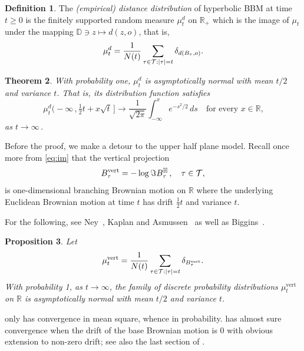 \documentclass[12pt]{amsart}
\newcommand\BB{\textit{\textbf{B}}}
\newcommand\DD{\mathbb D}
\newcommand\HH{\mathbb H}
\newcommand\nn{N}
\newcommand\R{\mathbb R}
\newcommand\ro{d}
\newcommand\T{\mathcal T}
\newtheorem{theorem}{Theorem}%
\numberwithin{theorem}{section}
\newtheorem{pro}[theorem]{Proposition}%
\theoremstyle{definition}
\newtheorem{dfn}[theorem]{Definition}%
\begin{document}
\begin{dfn}\label{def:distdist}
 The \emph{(empirical) distance distribution} of hyperbolic BBM at time $t\ge 0$ is
the finitely supported random measure $\mu_t^{\ro}$ on $\R_+$ which is the image of 
$\mu_t$ under the mapping $\DD \ni z \mapsto \ro(z,o)$, that is,
$$
\mu_t^{\ro} = \frac{1}{\nn(t)}\sum_{\tau \in \T: |\tau| = t} \delta_{\ro(\BB_{\tau},o)}.
$$
\end{dfn}

\begin{theorem}\label{thm:normal}
With probability one, $\mu_t^{\ro}$ is asymptotically normal with  mean
$t/2$ and variance $t$. That is, its distribution function satisfies 
$$
\mu_t^{\ro}\bigl(-\infty\,,\tfrac12 t + x \sqrt{t}\,\bigr] 
\to \frac{1}{\sqrt{2\pi}} \int_{-\infty}^x  e^{-s^2/2}\, ds  \quad \text{for every $x \in \R$,}
$$
as $t \to \infty\,$. 
\end{theorem}

Before the proof, we make a detour to the upper half plane model. Recall once more 
from \eqref{eq:im} that the vertical projection  
$$
\BB_{\tau}^{\text{vert}} = -\log \Im \BB_{\tau}^{\HH}\,, \quad \tau \in \T, 
$$
is one-dimensional branching Brownian motion on $\R$ where the 
underlying Euclidean Brownian motion at time $t$ has drift $\frac12 t$
and variance $t$.

For the following, see {\sc Ney}~\cite[Thm. 2]{Ney}, {\sc Kaplan and Asmussen}~\cite[Thm. 3]{KA}
as well as {\sc Biggins}~\cite{Bi2}.

\begin{pro}\label{pro:ney} Let
$$
\mu_t^{\text{vert}} 
= \frac{1}{\nn(t)}\sum_{\tau \in \T: |\tau| = t} \delta_{\BB_{\tau}^{\text{vert}}}.
$$
With probability 1, as $t\to \infty$, the family of discrete probability distributions
$\mu_t^{\text{vert}}$  on $\R$ is asymptotically normal with  mean
$t/2$ and variance $t$. 
\end{pro}

\cite{Ney} only has convergence in mean square, whence in probability. \cite{KA} has almost sure
convergence when the drift of the base Brownian motion is $0$ with obvious extension to non-zero drift;
see also the last section of \cite{Bi2}.
\end{document}
